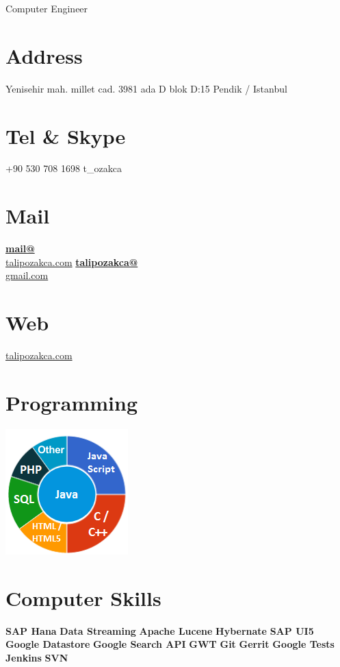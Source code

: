 \documentclass[]{friggeri-cv}
\begin{document}
      {Computer Engineer}
      

\begin{aside}
  \section{Address}
    Yenisehir mah. millet cad. 3981 ada D blok D:15 Pendik / Istanbul
    ~
  \section{Tel \& Skype}
    +90 530 708 1698
    t\_ozakca
    ~
  \section{Mail}
    \href{mailto:mail@talipozakca.com}{\textbf{mail@}\\talipozakca.com}
    \href{mailto:talipozakca@gmail.com}{\textbf{talipozakca@}\\gmail.com}
    ~
  \section{Web}
    \href{http://www.talipozakca.com}{talipozakca.com}
    ~
  \section{Programming}
    \includegraphics[scale=0.62]{img/programming.png}
    ~
    \section{Computer Skills}
    \textbf{}
    \textbf{SAP Hana}
    \textbf{Data Streaming}
    \textbf{Apache Lucene}
    \textbf{Hybernate}
    \textbf{SAP UI5}
    \textbf{Google Datastore}
    \textbf{Google Search API}
    \textbf{GWT}
    \textbf{Git}
    \textbf{Gerrit}
    \textbf{Google Tests}
    \textbf{Jenkins}
    \textbf{SVN}
    ~
  
\end{aside}
\end{document}
